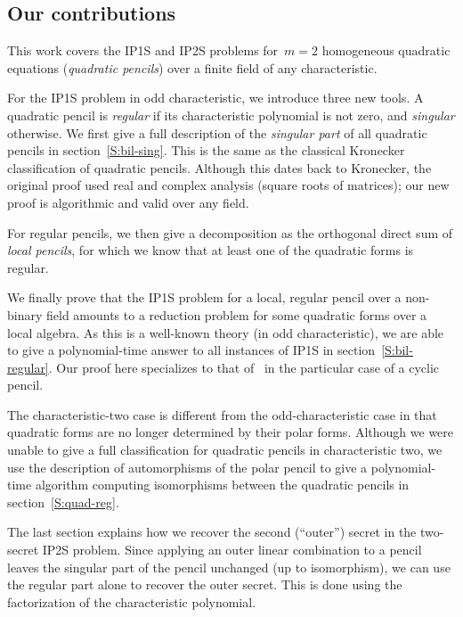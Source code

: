 \documentclass{article}%
\begin{document}

\subsection*{Our contributions}%
This work covers the IP1S and IP2S problems
for~$m = 2$ homogeneous quadratic equations (\emph{quadratic pencils})
over a finite field of any characteristic.

For the IP1S problem in odd characteristic, we introduce three new tools.
A quadratic pencil is \emph{regular}
if its characteristic polynomial is not zero, and \emph{singular} otherwise.
We first give a full description of the \emph{singular part}
of all quadratic pencils in section~\ref{S:bil-sing}.
This is the same as the classical Kronecker classification of quadratic
pencils.
Although this dates back to Kronecker, the original proof used real and
complex analysis (square roots of matrices);
our new proof is algorithmic and valid over any field.

For regular pencils, we then give a decomposition as the orthogonal
direct sum of \emph{local pencils}, for which we know that at least one
of the quadratic forms is regular.

We finally prove that the IP1S problem
for a local, regular pencil over a non-binary field
amounts to a reduction problem for some quadratic forms over a local algebra.
As this is a well-known theory (in odd characteristic), we are able to
give a polynomial-time answer to all instances of IP1S in
section~\ref{S:bil-regular}. Our proof here specializes to that
of~\cite{MPG2013} in the particular case of a cyclic pencil.

The characteristic-two case is different from the odd-characteristic case
in that quadratic forms are no longer determined by their polar forms.
Although we were unable to give a full classification
for quadratic pencils in characteristic two,
we use the description of automorphisms of the polar pencil
to give a polynomial-time algorithm computing isomorphisms
between the quadratic pencils in section~\ref{S:quad-reg}.

\medskip

The last section explains how we recover the second (``outer'') secret
in the two-secret IP2S problem.
Since applying an outer linear combination to a pencil
leaves the singular part of the pencil unchanged (up to isomorphism),
we can use the regular part alone to recover the outer secret.
This is done using the factorization of the characteristic polynomial.
\end{document}
